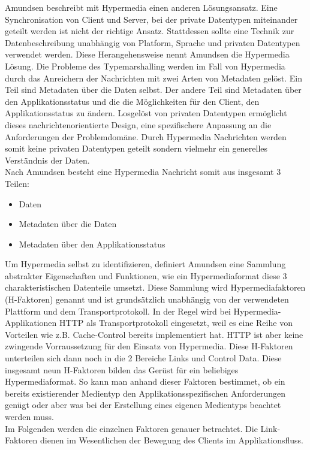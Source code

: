 Amundsen beschreibt mit Hypermedia einen anderen Lösungsansatz. Eine Synchronisation von Client und Server, bei der private Datentypen miteinander geteilt werden ist nicht der richtige Ansatz. Stattdessen sollte eine Technik zur Datenbeschreibung unabhängig von Platform, Sprache und privaten Datentypen verwendet werden. Diese Herangehensweise nennt Amundsen die Hypermedia Lösung. Die Probleme des Typemarshalling werden im Fall von Hypermedia durch das Anreichern der Nachrichten mit zwei Arten von Metadaten gelöst. Ein Teil sind Metadaten über die Daten selbst. Der andere Teil sind Metadaten über den Applikationsstatus und die die Möglichkeiten für den Client, den Applikationsstatus zu ändern. Losgelöst von privaten Datentypen ermöglicht dieses nachrichtenorientierte Design, eine spezifischere Anpassung an die Anforderungen der Problemdomäne. Durch Hypermedia Nachrichten werden somit keine privaten Datentypen geteilt sondern vielmehr ein generelles Verständnis der Daten.\\
Nach Amundsen besteht eine Hypermedia Nachricht somit aus insgesamt 3 Teilen:
\begin{itemize}
\item Daten
\item Metadaten über die Daten
\item Metadaten über den Applikationsstatus
\end{itemize}
Um Hypermedia selbst zu identifizieren, definiert Amundsen eine Sammlung abstrakter Eigenschaften und Funktionen, wie ein Hypermediaformat diese 3 charakteristischen Datenteile umsetzt. Diese Sammlung wird Hypermediafaktoren (H-Faktoren) genannt und ist grundsätzlich unabhängig von der verwendeten Plattform und dem Transportprotokoll. In der Regel wird bei Hypermedia-Applikationen HTTP als Transportprotokoll eingesetzt, weil es eine Reihe von Vorteilen wie z.B. Cache-Control bereits implementiert hat. HTTP ist aber keine zwingende Vorraussetzung für den Einsatz von Hypermedia. Diese H-Faktoren unterteilen sich dann noch in die 2 Bereiche Links und Control Data. Diese insgesamt neun H-Faktoren bilden das Gerüst für ein beliebiges Hypermediaformat. So kann man anhand dieser Faktoren bestimmet, ob ein bereits existierender Medientyp den Applikationsspezifischen Anforderungen genügt oder aber was bei der Erstellung eines eigenen Medientyps beachtet werden muss.\\
Im Folgenden werden die einzelnen Faktoren genauer betrachtet. Die Link-Faktoren dienen im Wesentlichen der Bewegung des Clients im Applikationsfluss.\\
